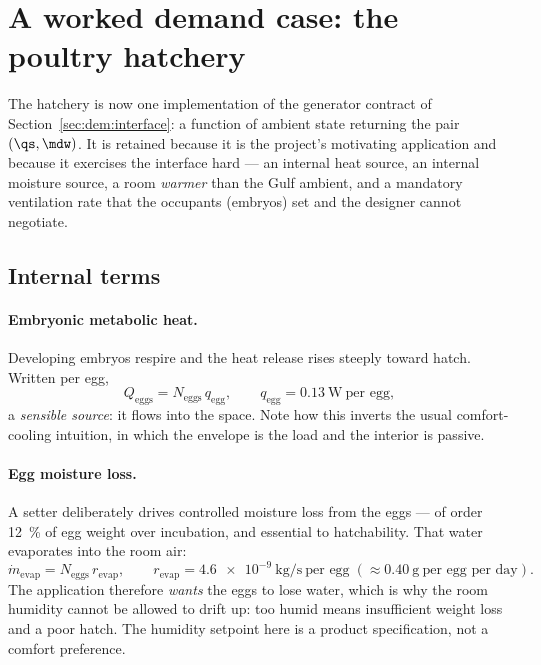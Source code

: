 \section{A worked demand case: the poultry hatchery}
\label{sec:dem:hatch}

The hatchery is now one implementation of the generator contract of
Section~\ref{sec:dem:interface}: a function of ambient state returning the pair
$(\qs,\mdw)$. It is retained because it is the project's motivating application
and because it exercises the interface hard --- an internal heat source, an
internal moisture source, a room \emph{warmer} than the Gulf ambient, and a
mandatory ventilation rate that the occupants (embryos) set and the designer
cannot negotiate.

\subsection{Internal terms}
\label{sec:dem:internal}

\paragraph{Embryonic metabolic heat.} Developing embryos respire and the heat
release rises steeply toward hatch. Written per egg,
\begin{equation}
Q_{\mathrm{eggs}}=N_{\mathrm{eggs}}\,q_{\mathrm{egg}},
\qquad q_{\mathrm{egg}}=\SI{0.13}{\watt}\ \text{per egg},
\label{eq:dem:Qeggs}
\end{equation}
a \emph{sensible source}: it flows into the space. Note how this inverts the
usual comfort-cooling intuition, in which the envelope is the load and the
interior is passive.

\paragraph{Egg moisture loss.} A setter deliberately drives controlled moisture
loss from the eggs --- of order \SI{12}{\percent} of egg weight over incubation,
and essential to hatchability. That water evaporates into the room air:
\begin{equation}
\dot m_{\mathrm{evap}}=N_{\mathrm{eggs}}\,r_{\mathrm{evap}},
\qquad r_{\mathrm{evap}}=\SI{4.6e-9}{\kilogram\per\second}\ \text{per egg}
\;(\approx\SI{0.40}{\gram}\ \text{per egg per day}).
\label{eq:dem:mevap}
\end{equation}
The application therefore \emph{wants} the eggs to lose water, which is why the
room humidity cannot be allowed to drift up: too humid means insufficient weight
loss and a poor hatch. The humidity setpoint here is a product specification, not
a comfort preference.

